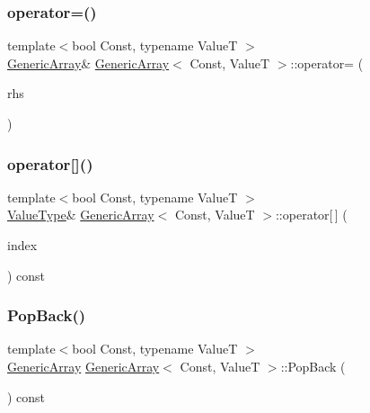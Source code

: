 \subsubsection{\texorpdfstring{operator=()}{operator=()}}
{\footnotesize\ttfamily template$<$bool Const, typename ValueT $>$ \\
\hyperlink{classGenericArray}{Generic\+Array}\& \hyperlink{classGenericArray}{Generic\+Array}$<$ Const, ValueT $>$\+::operator= (\begin{DoxyParamCaption}\item[{\hyperlink{classGenericArray_a25d2ed55daa117c41db6a5b3f87e9ddc}{const} \hyperlink{classGenericArray}{Generic\+Array}$<$ Const, ValueT $>$ \&}]{rhs }\end{DoxyParamCaption})\hspace{0.3cm}{\ttfamily [inline]}}

\mbox{\label{classGenericArray_aa185d997e7787e9b4f624d5de592b886}} 
\subsubsection{\texorpdfstring{operator[]()}{operator[]()}}
{\footnotesize\ttfamily template$<$bool Const, typename ValueT $>$ \\
\hyperlink{classGenericArray_a93e53f38a99fc5167eb2a28653de64ed}{Value\+Type}\& \hyperlink{classGenericArray}{Generic\+Array}$<$ Const, ValueT $>$\+::operator\mbox{[}$\,$\mbox{]} (\begin{DoxyParamCaption}\item[{\hyperlink{rapidjson_8h_a5ed6e6e67250fadbd041127e6386dcb5}{Size\+Type}}]{index }\end{DoxyParamCaption}) const\hspace{0.3cm}{\ttfamily [inline]}}

\mbox{\label{classGenericArray_afd1c75a82d2fc4366cde18256962edf6}} 
\subsubsection{\texorpdfstring{Pop\+Back()}{PopBack()}}
{\footnotesize\ttfamily template$<$bool Const, typename ValueT $>$ \\
\hyperlink{classGenericArray}{Generic\+Array} \hyperlink{classGenericArray}{Generic\+Array}$<$ Const, ValueT $>$\+::Pop\+Back (\begin{DoxyParamCaption}{ }\end{DoxyParamCaption}) const\hspace{0.3cm}{\ttfamily [inline]}}


